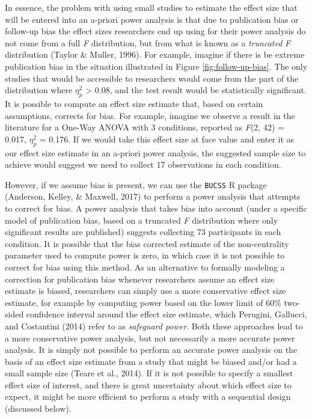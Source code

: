 \documentclass[
  english,
  ,jou, a4paper,floatsintext]{apa6}
\begin{document}
In essence, the problem with using small studies to estimate the effect size that will be entered into an a-priori power analysis is that due to publication bias or follow-up bias the effect sizes researchers end up using for their power analysis do not come from a full \emph{F} distribution, but from what is known as a \emph{truncated} \emph{F} distribution (Taylor \& Muller, 1996). For example, imagine if there is be extreme publication bias in the situation illustrated in Figure \ref{fig:follow-up-bias}. The only studies that would be accessible to researchers would come from the part of the distribution where \(\eta_p^2\) \textgreater{} 0.08, and the test result would be statistically significant. It is possible to compute an effect size estimate that, based on certain assumptions, corrects for bias. For example, imagine we observe a result in the literature for a One-Way ANOVA with 3 conditions, reported as \emph{F}(2, 42) = 0.017, \(\eta_p^2\) = 0.176. If we would take this effect size at face value and enter it as our effect size estimate in an a-priori power analysis, the suggested sample size to achieve would suggest we need to collect 17 observations in each condition.

However, if we assume bias is present, we can use the \texttt{BUCSS} R package (Anderson, Kelley, \& Maxwell, 2017) to perform a power analysis that attempts to correct for bias. A power analysis that takes bias into account (under a specific model of publication bias, based on a truncated \emph{F} distribution where only significant results are published) suggests collecting 73 participants in each condition. It is possible that the bias corrected estimate of the non-centrality parameter used to compute power is zero, in which case it is not possible to correct for bias using this method. As an alternative to formally modeling a correction for publication bias whenever researchers assume an effect size estimate is biased, researchers can simply use a more conservative effect size estimate, for example by computing power based on the lower limit of 60\% two-sided confidence interval around the effect size estimate, which Perugini, Gallucci, and Costantini (2014) refer to as \emph{safeguard power}. Both these approaches lead to a more conservative power analysis, but not necessarily a more accurate power analysis. It is simply not possible to perform an accurate power analysis on the basis of an effect size estimate from a study that might be biased and/or had a small sample size (Teare et al., 2014). If it is not possible to specify a smallest effect size of interest, and there is great uncertainty about which effect size to expect, it might be more efficient to perform a study with a sequential design (discussed below).
\end{document}
